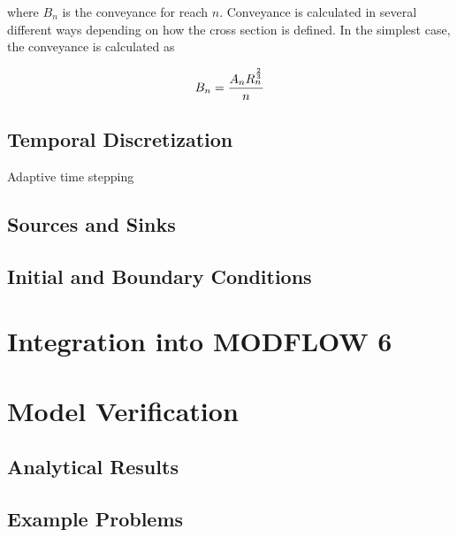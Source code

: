 \documentclass[fleqn]{article}
\begin{document}
\noindent where $B_n$ is the conveyance for reach $n$.  Conveyance is calculated in several different ways depending on how the cross section is defined.  In the simplest case, the conveyance is calculated as

\begin{equation}
  B_n = \frac{A_n R_n^{2 \over 3}}{n}
\end{equation}



\subsection{Temporal Discretization}
Adaptive time stepping

\subsection{Sources and Sinks}

\subsection{Initial and Boundary Conditions}

\section{Integration into MODFLOW 6}

\section{Model Verification}

\subsection{Analytical Results}

\subsection{Example Problems}
\end{document}
